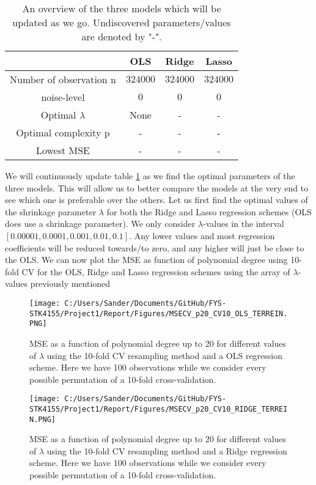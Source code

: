 \documentclass[12pt,a4paper]{article}
\begin{document}
\begin{table}[h]
\caption{\label{tab:update1} An overview of the three models which will be updated as we go. Undiscovered parameters/values are denoted by "-".}
\centering
\begin{tabular}{c|c|c|c}
 & OLS & Ridge & Lasso\\
\hline
Number of observation n & $324000$ & $324000$ & $324000$\\
\hline
noise-level & $0$ & $0$ & $0$\\
\hline
Optimal $\lambda$ & None & - & -\\
\hline
Optimal complexity p & - & - & -\\
\hline
Lowest MSE & - & - & -\\
\end{tabular}
\end{table}

\noindent We will continuously update table \ref{tab:update1} as we find the optimal parameters of the three models. This will allow us to better compare the models at the very end to see which one is preferable over the others. Let us first find the optimal values of the shrinkage parameter $\lambda$ for both the Ridge and Lasso regression schemes (OLS does use a shrinkage parameter). We only consider $\lambda$-values in the interval $[0.00001,0.0001,0.001,0.01,0.1]$. Any lower values and most regression coefficients will be reduced towards/to zero, and any higher will just be close to the OLS. We can now plot the MSE as function of polynomial degree using 10-fold CV for the OLS, Ridge and Lasso regression schemes using the array of $\lambda$-values previously mentioned

\begin{figure}[H]
\centering
\texttt{[image: C:/Users/Sander/Documents/GitHub/FYS-STK4155/Project1/Report/Figures/MSECV\_p20\_CV10\_OLS\_TERREIN.PNG]}
\caption{\label{fig:MSEOLST} MSE as a function of polynomial degree up to 20 for different values of $\lambda$ using the 10-fold CV resampling method and a OLS regression scheme. Here we have 100 observations while we consider every possible permutation of a 10-fold cross-validation.}
\end{figure}

\begin{figure}[H]
\centering
\texttt{[image: C:/Users/Sander/Documents/GitHub/FYS-STK4155/Project1/Report/Figures/MSECV\_p20\_CV10\_RIDGE\_TERREIN.PNG]}
\caption{\label{fig:MSERIDGET} MSE as a function of polynomial degree up to 20 for different values of $\lambda$ using the 10-fold CV resampling method and a Ridge regression scheme. Here we have 100 observations while we consider every possible permutation of a 10-fold cross-validation.}
\end{figure}
\end{document}
